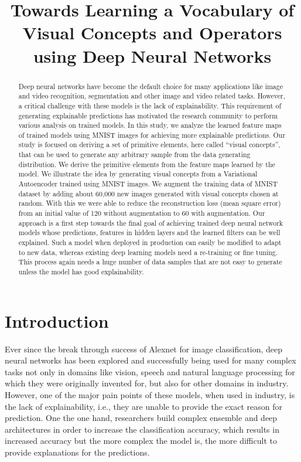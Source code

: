 \documentclass{}
\title{Towards Learning a Vocabulary of Visual Concepts and Operators using Deep Neural Networks}
\begin{document}
\maketitle

\begin{abstract}
    Deep neural networks have become the default choice for many applications like image and video recognition, segmentation and other image and video related tasks.
    However, a critical  challenge with these models is the lack of explainability.
    This requirement of generating explainable predictions has motivated the research community to perform various analysis on trained models.
    In this study, we analyze the learned feature maps of trained models using MNIST images for achieving more explainable predictions.
    Our study is focused on deriving a set of primitive elements, here called “visual concepts”, that can be used to generate any arbitrary sample from the data generating distribution.
    We derive the primitive elements from the feature maps learned by the model.
    We illustrate the idea by generating visual concepts from a Variational Autoencoder  trained using MNIST images.
    We augment the training data of MNIST dataset by adding about 60,000 new images generated with visual concepts chosen at random.
    With this we were able to reduce the reconstruction loss (mean square error) from an initial value of 120 without augmentation to 60 with augmentation.
    Our approach is a first step towards the final goal of achieving trained deep neural network models whose predictions, features in hidden layers and the learned filters can be well explained.
    Such a model when deployed in production can easily be modified to  adapt to new data, whereas existing deep learning models need a re-training or fine tuning.
    This process again needs a huge number of data samples that are not easy to generate unless the model has good explainability.
\end{abstract}

\section{Introduction}
Ever since the break through success of Alexnet \cite{krizhevsky2012imagenet} for image classification, deep neural networks has been explored and successfully being used for many complex tasks not only in domains like  vision, speech and natural language processing for which they were originally invented for, but also for other domains in industry.
However, one of the major pain points of these models, when used in industry, is the lack of explainability, i.e., they are unable to provide the exact reason for prediction.
One the one hand, researchers build complex ensemble and deep architectures in order to increase the classification accuracy, which results in increased accuracy but the more complex the model is, the more difficult to provide explanations for the predictions.
\end{document}
